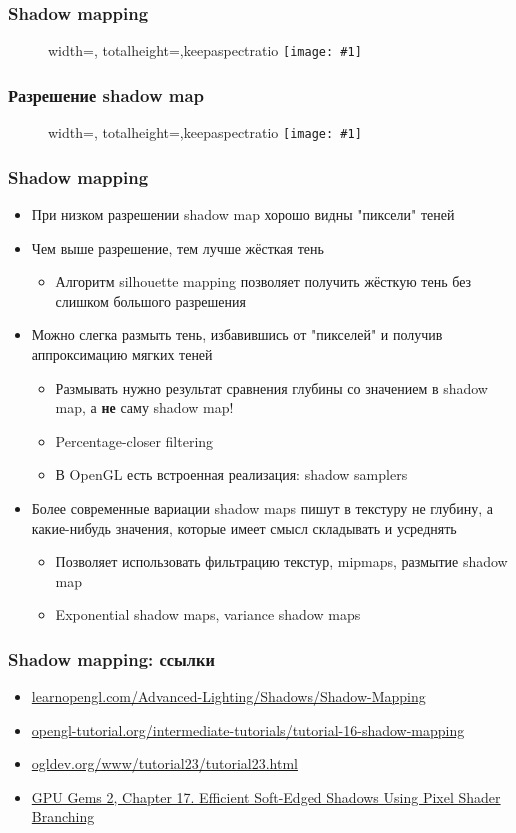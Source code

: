 \documentclass{beamer}
\newcommand{\slideimage}[1]{
  \begin{figure}
    \begin{adjustbox}{width=\textwidth, totalheight=\textheight-2\baselineskip-2\baselineskip,keepaspectratio}
      \texttt{[image: \#1]}
    \end{adjustbox}
  \end{figure}
}
\begin{document}
\begin{frame}[fragile]
\frametitle{Shadow mapping}
\slideimage{shadow-mapping3.png}
\end{frame}

\begin{frame}[fragile]
\frametitle{Разрешение shadow map}
\slideimage{shadow-map-resolution.png}
\end{frame}

\begin{frame}[fragile]
\frametitle{Shadow mapping}
\fontsize{10pt}{10pt}
\begin{itemize}
\item При низком разрешении shadow map хорошо видны "пиксели"{} теней
\pause
\item Чем выше разрешение, тем лучше жёсткая тень
\pause
\begin{itemize}
\item Алгоритм silhouette mapping позволяет получить жёсткую тень без слишком большого разрешения
\end{itemize}
\pause
\item Можно слегка размыть тень, избавившись от "пикселей"{} и получив аппроксимацию мягких теней
\pause
\begin{itemize}
\item Размывать нужно результат сравнения глубины со значением в shadow map, а \textbf{не} саму shadow map!
\pause
\item Percentage-closer filtering
\pause
\item В OpenGL есть встроенная реализация: shadow samplers
\end{itemize}
\pause
\item Более современные вариации shadow maps пишут в текстуру не глубину, а какие-нибудь значения, которые имеет смысл складывать и усреднять
\pause
\begin{itemize}
\item Позволяет использовать фильтрацию текстур, mipmaps, размытие shadow map
\pause
\item Exponential shadow maps, variance shadow maps
\end{itemize}
\end{itemize}
\end{frame}

\begin{frame}[fragile]
\frametitle{Shadow mapping: ссылки}
\begin{itemize}
\item \href{https://learnopengl.com/Advanced-Lighting/Shadows/Shadow-Mapping}{learnopengl.com/Advanced-Lighting/Shadows/Shadow-Mapping}
\item \href{http://www.opengl-tutorial.org/intermediate-tutorials/tutorial-16-shadow-mapping}{opengl-tutorial.org/intermediate-tutorials/tutorial-16-shadow-mapping}
\item \href{https://ogldev.org/www/tutorial23/tutorial23.html}{ogldev.org/www/tutorial23/tutorial23.html}
\item \href{https://developer.nvidia.com/gpugems/gpugems2/part-ii-shading-lighting-and-shadows/chapter-17-efficient-soft-edged-shadows-using}{GPU Gems 2, Chapter 17. Efficient Soft-Edged Shadows Using Pixel Shader Branching}
\end{itemize}
\end{frame}
\end{document}
